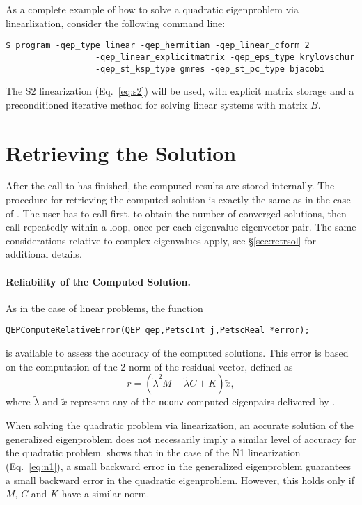 As a complete example of how to solve a quadratic eigenproblem via linearlization, consider the following command line:
\begin{Verbatim}[fontsize=\small]
	$ program -qep_type linear -qep_hermitian -qep_linear_cform 2
                  -qep_linear_explicitmatrix -qep_eps_type krylovschur
                  -qep_st_ksp_type gmres -qep_st_pc_type bjacobi
\end{Verbatim}
The S2 linearization (Eq.\ \ref{eq:s2}) will be used, with explicit matrix storage and a preconditioned iterative method for solving linear systems with matrix $B$.

\section{Retrieving the Solution}

After the call to  has finished, the computed results are stored internally. The procedure for retrieving the computed solution is exactly the same as in the case of . The user has to call  first, to obtain the number of converged solutions, then call  repeatedly within a loop, once per each eigenvalue-eigenvector pair. The same considerations relative to complex eigenvalues apply, see \S\ref{sec:retrsol} for additional details.

\paragraph{Reliability of the Computed Solution.}

As in the case of linear problems, the function
	\begin{Verbatim}[fontsize=\small]
	QEPComputeRelativeError(QEP qep,PetscInt j,PetscReal *error);
	\end{Verbatim}
is available to assess the accuracy of the computed solutions. This error is based on the computation of the 2-norm of the residual vector, defined as
\begin{equation}
r=(\tilde{\lambda}^2M+\tilde{\lambda} C+K)\tilde{x},\label{eq:resquad}
\end{equation}
where $\tilde{\lambda}$ and $\tilde{x}$ represent any of the \texttt{nconv} computed eigenpairs delivered by .

When solving the quadratic problem via linearization, an accurate solution of the generalized eigenproblem does not necessarily imply a similar level of accuracy for the quadratic problem. \cite{Tisseur:2000:BEC} shows that in the case of the N1 linearization (Eq.\ \ref{eq:n1}), a small backward error in the generalized eigenproblem guarantees a small backward error in the quadratic eigenproblem. However, this holds only if $M$, $C$ and $K$ have a similar norm.

